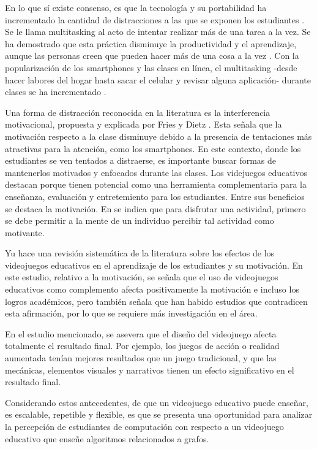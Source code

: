 En lo que sí existe consenso, es que la tecnología y su portabilidad ha incrementado la cantidad de distracciones a las que se exponen
los estudiantes \cite{Zimmerman2011HandbookOS, Wang2022ComprehensivelySummarizeDistractions}. Se le llama multitasking al acto de intentar realizar más de una tarea a la vez. Se ha demostrado que esta práctica disminuye la productividad y el aprendizaje, aunque las personas creen que pueden hacer más de una cosa a la vez \cite{Domoff2019AddictivePU}.  Con la popularización de los smartphones y las clases en línea, el multitasking -desde hacer labores del hogar hasta sacar el celular y revisar alguna aplicación- durante clases se ha incrementado \cite{Wang2022ComprehensivelySummarizeDistractions}.

Una forma de distracción reconocida en la literatura es la interferencia motivacional, propuesta y explicada por Fries y Dietz \cite{Fries2007LearningMotivationalInterference}. Esta señala que la motivación respecto a la clase disminuye debido a la presencia de tentaciones más atractivas para la atención, como los smartphones. En este contexto, donde los estudiantes se ven tentados a distraerse, es importante buscar formas de mantenerlos motivados y enfocados durante las clases.
Los videjuegos educativos destacan porque tienen potencial como una herramienta complementaria para la enseñanza, evaluación y entretemiento para los estudiantes. Entre sus beneficios se destaca la motivación. En \cite{Bisson1996FunInLEarningPedagogicalRole} se indica que para disfrutar una actividad, primero se debe permitir a la mente de un individuo percibir tal actividad como motivante. 

Yu hace una revisión sistemática de la literatura \cite{Yu2020TheEffectsOfEducationGames} sobre los efectos de los videojuegos educativos en el aprendizaje de los estudiantes y su motivación. En este estudio, relativo a la motivación, se señala que el uso de videojuegos educativos como complemento afecta positivamente la motivación e incluso los logros académicos, pero también señala que han habido estudios que contradicen esta afirmación, por lo que se requiere más investigación en el área.

En el estudio mencionado, se asevera que el diseño del videojuego afecta totalmente el resultado final. Por ejemplo, los juegos de acción o realidad aumentada tenían mejores resultados que un juego tradicional, y que las mecánicas, elementos visuales y narrativos tienen un efecto significativo en el resultado final.

Considerando estos antecedentes, de que un videojuego educativo puede enseñar, es escalable, repetible y flexible, es que se presenta una oportunidad para analizar la percepción de estudiantes de computación con respecto a un videojuego educativo que enseñe algoritmos relacionados a grafos.

